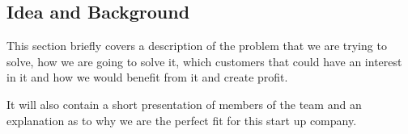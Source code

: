 \subsection{Idea and Background}
This section briefly covers a description of the problem that we are trying to solve, how we are going to solve it, which customers that could have an interest in it and how we would benefit from it and create profit.

It will also contain a short presentation of members of the team and an explanation as to why we are the perfect fit for this start up company.

